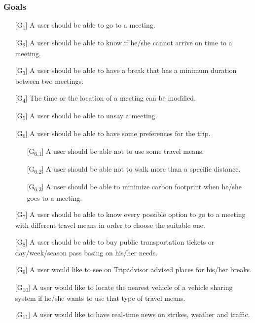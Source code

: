 \documentclass[12pt,titlepage]{article}
\begin{document}
\subsubsection{Goals}\label{RASD}
\begin{itemize}

\item [{[G\textsubscript{1}]}]	A user should be able to go to a meeting.
\item [{[G\textsubscript{2}]}]	A user should be able to know if he/she cannot arrive on time to a meeting.
\item [{[G\textsubscript{3}]}]	A user should be able to have a break that has a minimum duration between two meetings.
\item [{[G\textsubscript{4}]}]	The time or the location of a meeting can be modified.

\item [{[G\textsubscript{5}]}]  A user should be able to unsay  a meeting.
\item  [{[G\textsubscript{6}]}] A user should be able to have some preferences for the trip.
\begin{itemize}
\item [{[G\textsubscript{6.1}]}]	A user should be able not to use some travel means.
\item [{[G\textsubscript{6.2}]}]	A user should be able not to walk more than a specific distance.
\item [{[G\textsubscript{6.3}]}] A user should be able to minimize carbon footprint when he/she goes to a meeting.
\end{itemize}
\item [{[G\textsubscript{7}]}] A user should be able to know every possible option to go to a meeting with different travel means in order to choose the suitable one.
\item [{[G\textsubscript{8}]}]	A user should be able to buy public transportation tickets or day/week/season pass basing on his/her needs.
\item [{[G\textsubscript{9}]}]	A user would like to see on Tripadvisor advised places for his/her breaks.
\item [{[G\textsubscript{10}]}]	A user would like to locate the nearest vehicle of a vehicle sharing system if he/she wants to use that type of travel means.
\item [{[G\textsubscript{11}]}]	A user would like to have real-time news on strikes, weather and traffic.

 \end{itemize}
\end{document}

